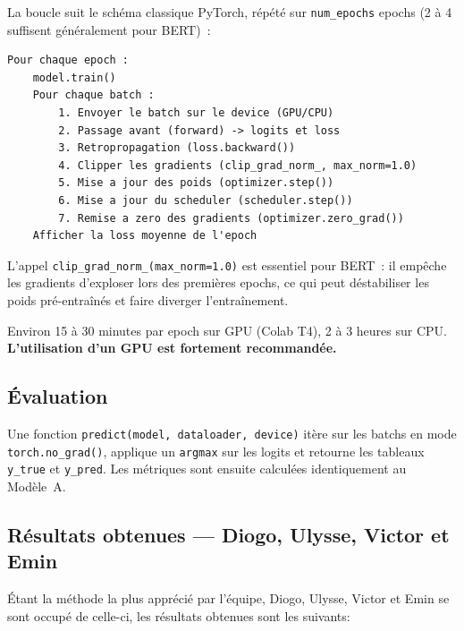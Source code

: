 \documentclass[12pt,a4paper]{article}
\begin{document}
La boucle suit le schéma classique PyTorch, répété sur \texttt{num\_epochs} epochs
(2 à 4 suffisent généralement pour BERT)~:

\begin{lstlisting}[language={}]
Pour chaque epoch :
    model.train()
    Pour chaque batch :
        1. Envoyer le batch sur le device (GPU/CPU)
        2. Passage avant (forward) -> logits et loss
        3. Retropropagation (loss.backward())
        4. Clipper les gradients (clip_grad_norm_, max_norm=1.0)
        5. Mise a jour des poids (optimizer.step())
        6. Mise a jour du scheduler (scheduler.step())
        7. Remise a zero des gradients (optimizer.zero_grad())
    Afficher la loss moyenne de l'epoch
\end{lstlisting}

\begin{warnbox}
L'appel \texttt{clip\_grad\_norm\_(max\_norm=1.0)} est essentiel pour BERT~: il empêche
les gradients d'exploser lors des premières epochs, ce qui peut déstabiliser les poids
pré-entraînés et faire diverger l'entraînement.
\end{warnbox}

\begin{warnbox}
Environ 15 à 30 minutes par epoch sur GPU (Colab T4), 2 à 3 heures sur CPU.
\textbf{L'utilisation d'un GPU est fortement recommandée.}
\end{warnbox}

\subsection{Évaluation}

Une fonction \texttt{predict(model, dataloader, device)} itère sur les batchs en mode \\
\texttt{torch.no\_grad()}, applique un \texttt{argmax} sur les logits et retourne les
tableaux \texttt{y\_true} et \texttt{y\_pred}. Les métriques sont ensuite calculées
identiquement au Modèle~A.

\subsection{Résultats obtenues — Diogo, Ulysse, Victor et Emin}

Étant la méthode la plus apprécié par l'équipe, Diogo, Ulysse, Victor et Emin se sont occupé de 
celle-ci, les résultats obtenues sont les suivants:\\
\end{document}
